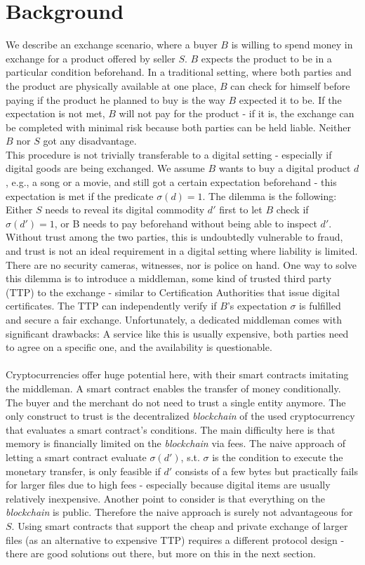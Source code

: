 \documentclass{cacthesis}
\newcounter{protocol}
\begin{document}
	    \section{Background}
        We describe an exchange scenario, where a buyer $B$ is willing to spend money in exchange for a product offered by seller $S$. $B$ expects the product to be in a particular condition beforehand. In a traditional setting, where both parties and the product are physically available at one place, $B$ can check for himself before paying if the product he planned to buy is the way $B$ expected it to be. If the expectation is not met, $B$ will not pay for the product - if it is, the exchange can be completed with minimal risk because both parties can be held liable. Neither $B$ nor $S$ got any disadvantage. \\
        This procedure is not trivially transferable to a digital setting - especially if digital goods are being exchanged. We assume $B$ wants to buy a digital product $d$, e.g., a song or a movie, and still got a certain expectation beforehand - this expectation is met if the predicate $\sigma\left( d\right) =1$. The dilemma is the following: Either $S$ needs to reveal its digital commodity $d'$ first to let $B$ check if $\sigma\left( d'\right) =1$, or B needs to pay beforehand without being able to inspect $d'$. Without trust among the two parties, this is undoubtedly vulnerable to fraud, and trust is not an ideal requirement in a digital setting where liability is limited. There are no security cameras, witnesses, nor is police on hand. One way to solve this dilemma is to introduce a middleman, some kind of trusted third party (TTP) to the exchange - similar to Certification Authorities that issue digital certificates. The TTP can independently verify if $B$'s expectation $\sigma$ is fulfilled and secure a fair exchange. Unfortunately, a dedicated middleman comes with significant drawbacks: A service like this is usually expensive, both parties need to agree on a specific one, and the availability is questionable. \\\\
        Cryptocurrencies offer huge potential here, with their smart contracts imitating the middleman. A smart contract enables the transfer of money conditionally. The buyer and the merchant do not need to trust a single entity anymore. The only construct to trust is the decentralized \textit{blockchain} of the used cryptocurrency that evaluates a smart contract's conditions. The main difficulty here is that memory is financially limited on the \textit{blockchain} via fees. The naive approach of letting a smart contract evaluate $\sigma\left( d'\right)$, s.t. $\sigma$ is the condition to execute the monetary transfer, is only feasible if $d'$ consists of a few bytes but practically fails for larger files due to high fees - especially because digital items are usually relatively inexpensive. Another point to consider is that everything on the \textit{blockchain} is public. Therefore the naive approach is surely not advantageous for $S$. Using smart contracts that support the cheap and private exchange of larger files (as an alternative to expensive TTP) requires a different protocol design - there are good solutions out there, but more on this in the next section.   \\ 
\end{document}

